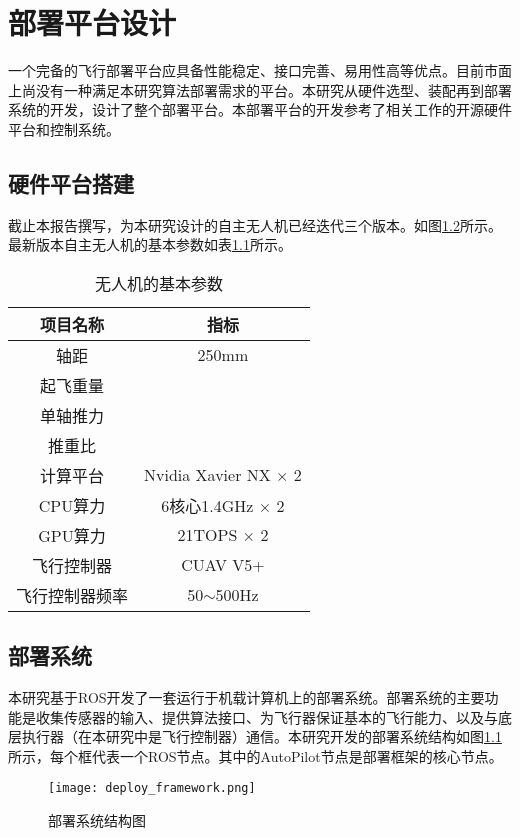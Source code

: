 
\chapter{部署平台设计}
一个完备的飞行部署平台应具备性能稳定、接口完善、易用性高等优点。目前市面上尚没有一种满足本研究算法部署需求的平台。本研究从硬件选型、装配再到部署系统的开发，设计了整个部署平台。本部署平台的开发参考了相关工作的开源硬件平台\cite{zhou2020ego}和控制系统\cite{Faessler18ral}。

\section{硬件平台搭建}

截止本报告撰写，为本研究设计的自主无人机已经迭代三个版本。如图\ref{}所示。最新版本自主无人机的基本参数如表\ref{tab_drone_param}所示。
\begin{table}
    \centering
    \begin{tabular}{cc}
    \hline
        项目名称 & 指标 \\ \hline
         轴距 & 250mm \\ 
        起飞重量 & ~ \\ 
        单轴推力 & ~ \\ 
        推重比 & ~ \\ 
         计算平台 & Nvidia Xavier NX $\times$ 2 \\ 
        CPU算力 & 6核心1.4GHz $\times$ 2 \\ 
        GPU算力 & 21TOPS $\times$ 2 \\ 
         飞行控制器 & CUAV V5+ \\ 
        飞行控制器频率 & 50$\sim$500Hz \\ \hline
    \end{tabular}
    \caption{无人机的基本参数}
    \label{tab_drone_param}
\end{table}


\section{部署系统}
本研究基于ROS开发了一套运行于机载计算机上的部署系统。部署系统的主要功能是收集传感器的输入、提供算法接口、为飞行器保证基本的飞行能力、以及与底层执行器（在本研究中是飞行控制器）通信。本研究开发的部署系统结构如图\ref{fig_deploy_framework}所示，每个框代表一个ROS节点。其中的AutoPilot节点是部署框架的核心节点。
\begin{figure}
    \centering
    \texttt{[image: deploy\_framework.png]}
    \caption{部署系统结构图}
    \label{fig_deploy_framework}
\end{figure}

